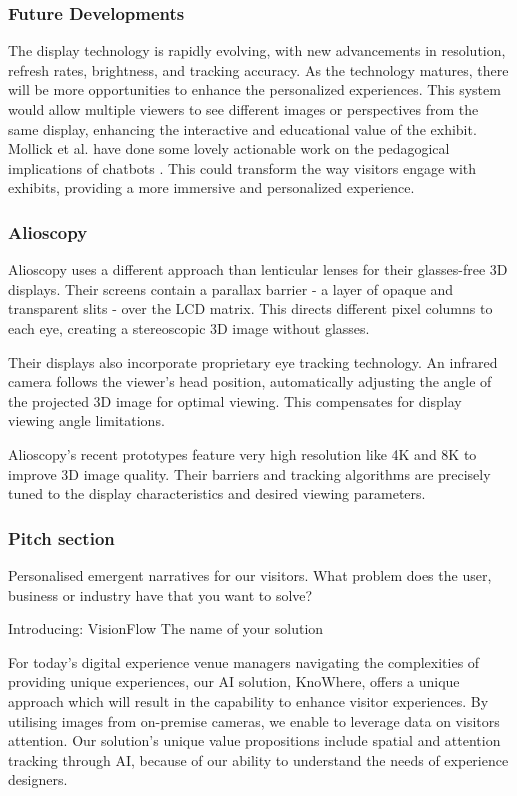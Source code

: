 \subsubsection{Future Developments}
The display technology is rapidly evolving, with new advancements in resolution, refresh rates, brightness, and tracking accuracy. As the technology matures, there will be more opportunities to enhance the personalized experiences.
This system would allow multiple viewers to see different images or perspectives from the same display, enhancing the interactive and educational value of the exhibit. Mollick et al. have done some lovely actionable work on the pedagogical implications of chatbots \cite{mollick2022new, mollick2023assigning, mollick2023using}. This could transform the way visitors engage with exhibits, providing a more immersive and personalized experience.



\subsubsection{Alioscopy}

Alioscopy uses a different approach than lenticular lenses for their glasses-free 3D displays. Their screens contain a parallax barrier - a layer of opaque and transparent slits - over the LCD matrix. This directs different pixel columns to each eye, creating a stereoscopic 3D image without glasses.

Their displays also incorporate proprietary eye tracking technology. An infrared camera follows the viewer's head position, automatically adjusting the angle of the projected 3D image for optimal viewing. This compensates for display viewing angle limitations.

Alioscopy's recent prototypes feature very high resolution like 4K and 8K to improve 3D image quality. Their barriers and tracking algorithms are precisely tuned to the display characteristics and desired viewing parameters.

\subsubsection{Pitch section}
Personalised emergent narratives for our visitors.
What problem does the user, business or industry have that you want to solve?

Introducing: VisionFlow
The name of your solution

For today's digital experience venue managers navigating the complexities of providing unique experiences, our AI solution, KnoWhere, offers a unique approach which will result in the capability to enhance visitor experiences. By utilising images from on-premise cameras, we enable to leverage data on visitors attention. Our solution's unique value propositions include spatial and attention tracking through AI, because of our ability to understand the needs of experience designers. 

